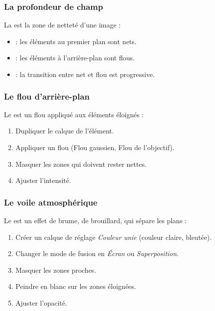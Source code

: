 \subsubsection{La profondeur de champ}

La  est la zone de netteté d'une image :

\begin{itemize}
    \item {} : les éléments au premier plan sont nets.
    \item {} : les éléments à l'arrière-plan sont flous.
    \item {} : la transition entre net et flou est progressive.
\end{itemize}

\subsubsection{Le flou d'arrière-plan}

Le  est un flou appliqué aux éléments éloignés :

\begin{enumerate}
    \item Dupliquer le calque de l'élément.
    \item Appliquer un flou (Flou gaussien, Flou de l'objectif).
    \item Masquer les zones qui doivent rester nettes.
    \item Ajuster l'intensité.
\end{enumerate}

\subsubsection{Le voile atmosphérique}

Le  est un effet de brume, de brouillard, qui sépare les plans :

\begin{enumerate}
    \item Créer un calque de réglage \emph{Couleur unie} (couleur claire, bleutée).
    \item Changer le mode de fusion en \emph{Écran} ou \emph{Superposition}.
    \item Masquer les zones proches.
    \item Peindre en blanc sur les zones éloignées.
    \item Ajuster l'opacité.
\end{enumerate}


